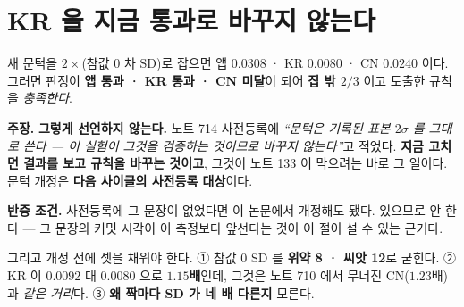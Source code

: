 \documentclass[10pt,a4paper]{article}
\newcommand{\claim}[2]{\begin{claimbox}\textbf{주장.} #1\par\smallskip
  \textcolor{gray!70}{\textbf{반증 조건.} #2}\end{claimbox}}
\begin{document}
\section{KR 을 지금 통과로 바꾸지 않는다}

새 문턱을 $2 \times$(참값 $0$ 차 SD)로 잡으면 앱 $0.0308$ · KR $\mathbf{0.0080}$ ·
CN $0.0240$ 이다. 그러면 판정이 \textbf{앱 통과 · KR 통과 · CN 미달}이 되어
\textbf{집 밖 $2/3$} 이고 도출한 규칙을 \emph{충족한다}.

\claim{\textbf{그렇게 선언하지 않는다.} 노트 714 사전등록에 \emph{``문턱은 기록된
표본 $2\sigma$ 를 그대로 쓴다 --- 이 실험이 그것을 검증하는 것이므로 바꾸지
않는다''}고 적었다. \textbf{지금 고치면 결과를 보고 규칙을 바꾸는 것이고}, 그것이
노트 133 이 막으려는 바로 그 일이다. 문턱 개정은 \textbf{다음 사이클의 사전등록
대상}이다.}
{사전등록에 그 문장이 없었다면 이 논문에서 개정해도 됐다. 있으므로 안 한다 ---
그 문장의 커밋 시각이 이 측정보다 앞선다는 것이 이 절이 설 수 있는 근거다.}

그리고 개정 전에 셋을 채워야 한다. ① 참값 $0$ SD 를 \textbf{위약 8 · 씨앗 12}로
굳힌다. ② KR 이 $0.0092$ 대 $0.0080$ 으로 \textbf{$1.15$배}인데, 그것은 노트 710
에서 무너진 CN($1.23$배)과 \emph{같은 거리}다. ③ \textbf{왜 짝마다 SD 가 네 배
다른지} 모른다.
\end{document}
